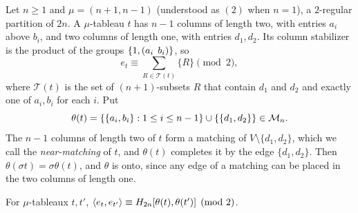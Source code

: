 Let $n\ge1$ and $\mu=(n+1,n-1)$ (understood as $(2)$ when $n=1$), a $2$-regular partition of $2n$. A $\mu$-tableau $t$ has $n-1$ columns of length two, with entries $a_i$ above $b_i$, and two columns of length one, with entries $d_1,d_2$. Its column stabilizer is the product of the groups $\{1,(a_i\;\,b_i)\}$, so
\[
e_t\equiv\sum_{R\in\mathcal T(t)}\{R\}\pmod2,
\]
where $\mathcal T(t)$ is the set of $(n+1)$-subsets $R$ that contain $d_1$ and $d_2$ and exactly one of $a_i,b_i$ for each $i$. Put
\[
\theta(t)=\{\{a_i,b_i\}:1\le i\le n-1\}\cup\{\{d_1,d_2\}\}\in\mathcal{M}_n.
\]
The $n-1$ columns of length two of $t$ form a matching of $V\setminus\{d_1,d_2\}$, which we call the \emph{near-matching} of $t$, and $\theta(t)$ completes it by the edge $\{d_1,d_2\}$. Then $\theta(\sigma t)=\sigma\theta(t)$, and $\theta$ is onto, since any edge of a matching can be placed in the two columns of length one.

\begin{lemma}\label{lem:nearmatch}
For $\mu$-tableaux $t,t'$, $\langle e_t,e_{t'}\rangle\equiv H_{2n}[\theta(t),\theta(t')]\pmod2$.
\end{lemma}

